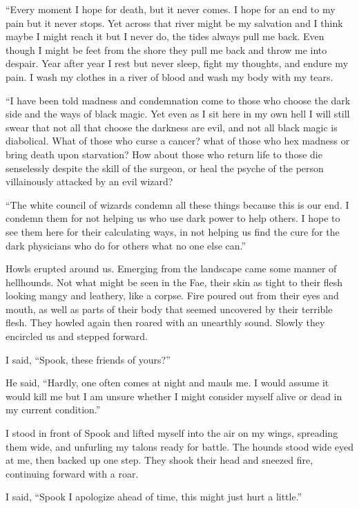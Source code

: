 ``Every moment I hope for death, but it never comes. I hope for an end to my pain but it never stops. Yet across that river might be my salvation and I think maybe I might reach it but I never do, the tides always pull me back. Even though I might be feet from the shore they pull me back and throw me into despair. Year after year I rest but never sleep, fight my thoughts, and endure my pain. I wash my clothes in a river of blood and wash my body with my tears. 

``I have been told madness and condemnation come to those who choose the dark side and the ways of black magic. Yet even as I sit here in my own hell I will still swear that not all that choose the darkness are evil, and not all black magic is diabolical. What of those who curse a cancer? what of those who hex madness or bring death upon starvation? How about those who return life to those die senselessly despite the skill of the surgeon, or heal the psyche of the person villainously attacked by an evil wizard?

``The white council of wizards condemn all these things because this is our end. I condemn them for not helping us who use dark power to help others. I hope to see them here for their calculating ways, in not helping us find the cure for the dark physicians who do for others what no one else can.''

Howls erupted around us. Emerging from the landscape came some manner of hellhounds. Not what might be seen in the Fae, their skin as tight to their flesh looking mangy and leathery, like a corpse. Fire poured out from their eyes and mouth, as well as parts of their body that seemed uncovered by their terrible flesh. They howled again then roared with an unearthly sound. Slowly they encircled us and stepped forward.

I said, ``Spook, these friends of yours?''

He said, ``Hardly, one often comes at night and mauls me. I would assume it would kill me but I am unsure whether I might consider myself alive or dead in my current condition.''

I stood in front of Spook and lifted myself into the air on my wings, spreading them wide, and unfurling my talons ready for battle. The hounds stood wide eyed at me, then backed up one step. They shook their head and sneezed fire, continuing forward with a roar.

I said, ``Spook I apologize ahead of time, this might just hurt a little.''

